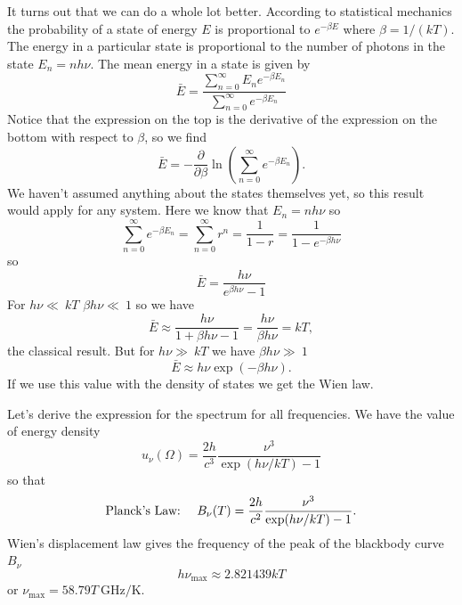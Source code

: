 It turns out that we can do a whole lot better.   According to
statistical mechanics the probability of a state of energy $E$ is
proportional to $e^{-\beta E}$ where $\beta = 1/(k T)$.  The energy 
in a particular state is proportional to the number of photons 
in the state $E_n=n h\nu$.  The mean energy in a state is given
by 
\begin{equation}
{\bar E} = \frac{\sum_{n=0}^\infty E_n e^{-\beta E_n}}
{\sum_{n=0}^\infty e^{-\beta E_n}}
\label{eq:35}
\end{equation}
Notice that the expression on the top is the derivative of the
expression on the bottom with respect to $\beta$, so we find
\begin{equation}
{\bar E} = -\frac{\partial}{\partial \beta} \ln \left (
\sum_{n=0}^\infty e^{-\beta E_n} \right ).
\label{eq:36}
\end{equation}
We haven't assumed anything about the states themselves yet, so this
result would apply for any system.   Here we know that $E_n = n h \nu$
so
\begin{equation}
\sum_{n=0}^\infty e^{-\beta E_n}  =
\sum_{n=0}^\infty r^n  = \frac{1}{1-r} = \frac{1}{1-e^{-\beta h \nu}}
\label{eq:37}
\end{equation}
so
\begin{equation}
{\bar E} = \frac{h \nu}{e^{\beta h \nu} - 1}
\label{eq:38}
\end{equation}
For $h \nu \ll\ k T$ $\beta h \nu \ll\ 1$ so we have
\begin{equation}
{\bar E} \approx \frac{h \nu}{1 + \beta h \nu - 1} = \frac{h
\nu}{\beta h \nu} = k T,
\label{eq:39}
\end{equation}
the classical result.  But for $h \nu \gg\ k T$ we have 
$\beta h \nu \gg\ 1$
\begin{equation}
{\bar E} \approx h \nu\exp(-\beta h \nu ).
\label{eq:40}
\end{equation}
If we use this value with the density of states we get the Wien law.

Let's derive the expression for the spectrum for all frequencies.
We have the value of energy density
\begin{equation}
u_\nu(\Omega) = \frac{2 h}{c^3} \frac{\nu^3}{\exp ( h \nu / k T) - 1}
\label{eq:41}
\end{equation}
so that
\begin{equation}
\hbox{\rm Planck's Law:}~~~~B_\nu (T) = \frac{2 h}{c^2} \frac{\nu^3}{\exp ( h \nu / k T) - 1}.
\label{eq:42}
\end{equation}
Wien's displacement law gives the frequency of the 
peak of the blackbody curve $B_\nu$
\begin{equation}
h \nu_\mathrm{max} \approx 2.821439 k T 
\label{eq:794}
\end{equation}
or $\nu_\mathrm{max}=58.79 T~\mathrm{GHz/K}$.

